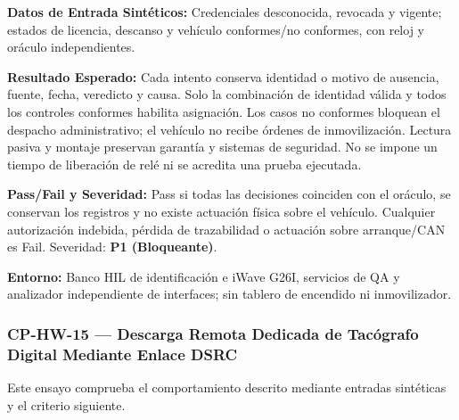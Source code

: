 \par\noindent \textbf{Datos de Entrada Sintéticos:} Credenciales desconocida, revocada y vigente; estados de licencia, descanso y vehículo conformes/no conformes, con reloj y oráculo independientes.\par
\par\noindent \textbf{Resultado Esperado:} Cada intento conserva identidad o motivo de ausencia, fuente, fecha, veredicto y causa. Solo la combinación de identidad válida y todos los controles conformes habilita asignación. Los casos no conformes bloquean el despacho administrativo; el vehículo no recibe órdenes de inmovilización. Lectura pasiva y montaje preservan garantía y sistemas de seguridad. No se impone un tiempo de liberación de relé ni se acredita una prueba ejecutada.\par
\par\noindent \textbf{Pass/Fail y Severidad:} Pass si todas las decisiones coinciden con el oráculo, se conservan los registros y no existe actuación física sobre el vehículo. Cualquier autorización indebida, pérdida de trazabilidad o actuación sobre arranque/CAN es Fail. Severidad: \textbf{P1 (Bloqueante)}.\par
\par\noindent \textbf{Entorno:} Banco HIL de identificación e iWave G26I, servicios de QA y analizador independiente de interfaces; sin tablero de encendido ni inmovilizador.\par


\subsubsection*{CP-HW-15 — Descarga Remota Dedicada de Tacógrafo Digital Mediante Enlace DSRC}\label{sec:9-cp-hw-15}
Este ensayo comprueba el comportamiento descrito mediante entradas sintéticas y el criterio siguiente.

